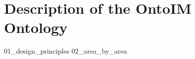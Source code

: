 \chapter{Description of the OntoIM Ontology}
\label{chp:ontoim-description}

{01_design_principles}%
{02_area_by_area}%